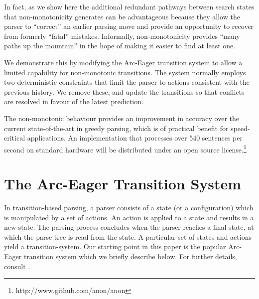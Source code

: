 \documentclass[11pt,letterpaper]{article}
\begin{document}
In fact, as we show here  the
additional redundant pathways between search states that non-monotonicity
generates can be advantageous because they allow the parser to ``correct'' an earlier
parsing move and provide an opportunity to recover from formerly ``fatal'' mistakes.
Informally, non-monotonicity provides ``many paths up the mountain'' in the hope
of making it easier to find at least one.

We demonstrate this by modifying the Arc-Eager transition system
\citep{nivre:04}
to allow a limited
capability for non-monotonic transitions. The system normally employs two
deterministic constraints that limit the parser to actions consistent with the
previous history. We remove these, and update the transitions
so that conflicts are resolved in favour of the latest prediction.

The non-monotonic behaviour provides an improvement in
accuracy over the current state-of-the-art in greedy parsing, which is of practical
benefit for speed-critical applications. An implementation that processes over 540
sentences per second on standard hardware will be distributed under an open source
license.\footnote{http://www.github.com/anon/anon}





\section{The Arc-Eager Transition System}
In transition-based parsing, a parser consists of a state (or a
configuration) which is manipulated by a set of actions.  An action is
applied to a state and results in a new state.  The parsing process
concludes when the parser reaches a final state, at which the
parse tree is read from the state.  A particular set of states and
actions yield a transition-system. Our starting
point in this paper is the popular Arc-Eager transition system which
we briefly describe below.  For further details, consult
\citep{nivre:04,nivre:cl}.
\end{document}
